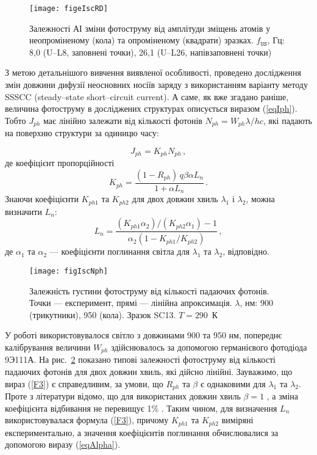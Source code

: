 \begin{figure}
\center
\texttt{[image: figeIscRD]}
\caption{\label{figeIscRD}
Залежності АІ зміни фотоструму від
амплітуди зміщень атомів у неопроміненому (кола)
та опроміненому (квадрати) зразках.
$f_\mathtt{US}$, Гц: 8,0 (U--L8, заповнені точки),
26,1 (U--L26, напівзаповнені точки)
}%
\end{figure}

З метою детальнішого вивчення виявленої особливості, проведено дослідження змін
довжини дифузії неосновних носіїв заряду з використанням
варіанту методу SSSCC (steady--state short--circuit current)\cite{Schroder2006}.
А саме, як вже згадано раніше, величина фотоструму в досліджених структурах
описується виразом (\ref{eqIph}).
Тобто $J_{ph}$ має лінійно залежати від кількості фотонів
\mbox{$N_{ph}=W_{ph}\lambda /hc$}, які падають на поверхню структури за одиницю часу:

\begin{equation}
J_{ph}=K_{ph}N_{ph}\,,
\end{equation}
де коефіцієнт пропорційності
\begin{equation}
 K_{ph}=\frac{(1-R_{ph})\,q\beta \alpha L_n} {1+\alpha L_n}\,.
\end{equation}
Знаючи коефіцієнти $K_{ph1}$ та $K_{ph2}$
для двох довжин хвиль $\lambda_1$ і $\lambda_2$, можна
визначити $L_n$:
\begin{equation}\label{F3}
L_n=\frac{(K_{ph1}\alpha_2)/(K_{ph2}\alpha_1)-1}{\alpha_2(1-K_{ph1}/K_{ph2})}\,,
\end{equation}
де $\alpha_1$ та $\alpha_2$ --- коефіцієнти поглинання світла для $\lambda_1$ та $\lambda_2$, відповідно.

\begin{figure}[b]
\center
\texttt{[image: figIscNph]}
\caption{\label{figIscNph}
Залежність густини фотоструму від кількості падаючих фотонів.
Точки --- експеримент, прямі --- лінійна апроксимація.
$\lambda$, нм: 900 (трикутники), 950 (кола). Зразок SC13. $T = 290$~К
}%
\end{figure}

У роботі використовувалося світло з довжинами 900 та 950 нм,
попереднє калібрування величини $W_{ph}$ здійснювалось
за допомогою германієвого фотодіода 9Э111А.
На рис.~\ref{figIscNph} показано типові залежності фотоструму від
кількості падаючих фотонів для двох довжин хвиль,
які дійсно лінійні.
Зауважимо, що вираз (\ref{F3}) є справедливим,
за умови, що $R_{ph}$ та $\beta$ є однаковими для $\lambda_1$ та $\lambda_2$.
Проте з літератури відомо, що для використаних довжин хвиль
$\beta=1$ \cite{Gaman}, а зміна коефіцієнта відбивання не перевищує 1\% \cite{GreenOptic,SiOptic:JAP1998,GreenOptic2}.
Таким чином, для визначення $L_n$ використовувалася формула (\ref{F3}),
причому $K_{ph1}$ та $K_{ph2}$ виміряні експериментально, а значення
коефіцієнтів поглинання обчислювалися за допомогою виразу (\ref{eqAlpha}).






